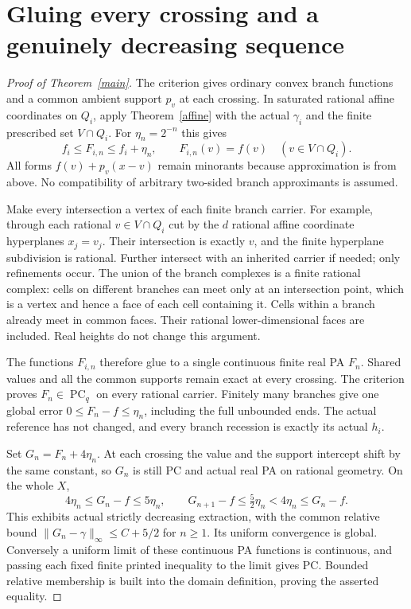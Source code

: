 \documentclass[11pt]{article}
\newcommand{\PC}{\operatorname{PC}_{q}}
\begin{document}
\section{Gluing every crossing and a genuinely decreasing sequence}
\begin{proof}[Proof of Theorem~\ref{main}]
The criterion gives ordinary convex branch functions and a common ambient support $p_v$ at each crossing. In saturated rational affine coordinates on $Q_i$, apply Theorem~\ref{affine} with the actual $\gamma_i$ and the finite prescribed set $V\cap Q_i$. For $\eta_n=2^{-n}$ this gives
\[
 f_i\leq F_{i,n}\leq f_i+\eta_n,\qquad F_{i,n}(v)=f(v)
                   \quad(v\in V\cap Q_i).
\]
All forms $f(v)+p_v(x-v)$ remain minorants because approximation is from above. No compatibility of arbitrary two-sided branch approximants is assumed.

Make every intersection a vertex of each finite branch carrier. For example, through each rational $v\in V\cap Q_i$ cut by the $d$ rational affine coordinate hyperplanes $x_j=v_j$. Their intersection is exactly $v$, and the finite hyperplane subdivision is rational. Further intersect with an inherited carrier if needed; only refinements occur. The union of the branch complexes is a finite rational complex: cells on different branches can meet only at an intersection point, which is a vertex and hence a face of each cell containing it. Cells within a branch already meet in common faces. Their rational lower-dimensional faces are included. Real heights do not change this argument.

The functions $F_{i,n}$ therefore glue to a single continuous finite real PA $F_n$. Shared values and all the common supports remain exact at every crossing. The criterion proves $F_n\in\PC$ on every rational carrier. Finitely many branches give one global error $0\leq F_n-f\leq\eta_n$, including the full unbounded ends. The actual reference has not changed, and every branch recession is exactly its actual $h_i$.

Set $G_n=F_n+4\eta_n$. At each crossing the value and the support intercept shift by the same constant, so $G_n$ is still PC and actual real PA on rational geometry. On the whole $X$,
\[
 4\eta_n\leq G_n-f\leq5\eta_n,\qquad
 G_{n+1}-f\leq\tfrac52\eta_n<4\eta_n\leq G_n-f.
\]
This exhibits actual strictly decreasing extraction, with the common relative bound $\|G_n-\gamma\|_\infty\leq C+5/2$ for $n\geq1$. Its uniform convergence is global. Conversely a uniform limit of these continuous PA functions is continuous, and passing each fixed finite printed inequality to the limit gives PC. Bounded relative membership is built into the domain definition, proving the asserted equality.


\end{proof}
\end{document}
